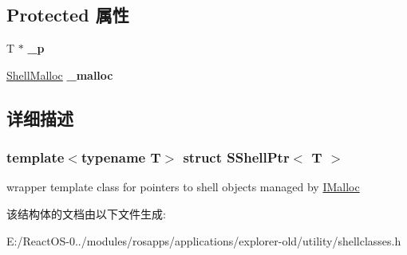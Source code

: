 \subsection*{Protected 属性}
\begin{DoxyCompactItemize}
\item 
\mbox{\label{struct_s_shell_ptr_a15f1e833aa753ce0d4a9eaba56271bba}} 
T $\ast$ {\bfseries \+\_\+p}
\item 
\mbox{\label{struct_s_shell_ptr_a0ef98d7fa3b49a8d65b7737f016479c6}} 
\hyperlink{struct_shell_malloc}{Shell\+Malloc} {\bfseries \+\_\+malloc}
\end{DoxyCompactItemize}


\subsection{详细描述}
\subsubsection*{template$<$typename T$>$\newline
struct S\+Shell\+Ptr$<$ T $>$}

wrapper template class for pointers to shell objects managed by \hyperlink{interface_i_malloc}{I\+Malloc} 

该结构体的文档由以下文件生成\+:\begin{DoxyCompactItemize}
\item 
E\+:/\+React\+O\+S-\/0../modules/rosapps/applications/explorer-\/old/utility/shellclasses.\+h\end{DoxyCompactItemize}
